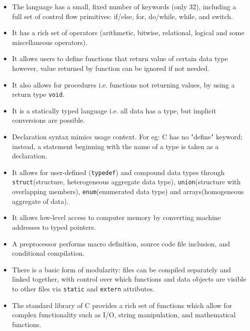\documentclass[report.tex]{subfiles}
\begin{document}
    \begin{itemize}
        \item{The language has a small, fixed number of keywords (only 32), including a full set of control flow primitives: if/else, for, do/while, while, and switch.}
        \item{It has a rich set of operators (arithmetic, bitwise, relational, logical and some miscellaneous operators).}
        \item{It allows users to define functions that return value of certain data type however, value returned by function can be ignored if not needed.}
        \item{It also allows for procedures i.e. functions not returning values, by using a return type \texttt{void}.}
        \item{It is a statically typed language i.e. all data has a type, but implicit conversions are possible.}
        \item{Declaration syntax mimics usage context. For eg: C has no "define" keyword; instead, a statement beginning with the name of a type is taken as a declaration.}
        \item{It allows for user-defined (\texttt{typedef}) and compound data types through \texttt{struct}(structure, heterogeneous aggregate data type), \texttt{union}(structure with overlapping members), \texttt{enum}(enumerated data type) and arrays(homogeneous aggregate of data).}
        \item{It allows low-level access to computer memory by converting machine addresses to typed pointers.}
        \item{A preprocessor performs macro definition, source code file inclusion, and conditional compilation.}
        \item{There is a basic form of modularity: files can be compiled separately and linked together, with control over which functions and data objects are visible to other files via \texttt{static} and \texttt{extern} attributes.}
        \item{The standard library of C provides a rich set of functions which allow for complex functionality such as I/O, string manipulation, and mathematical functions.}
    \end{itemize}
\end{document}
